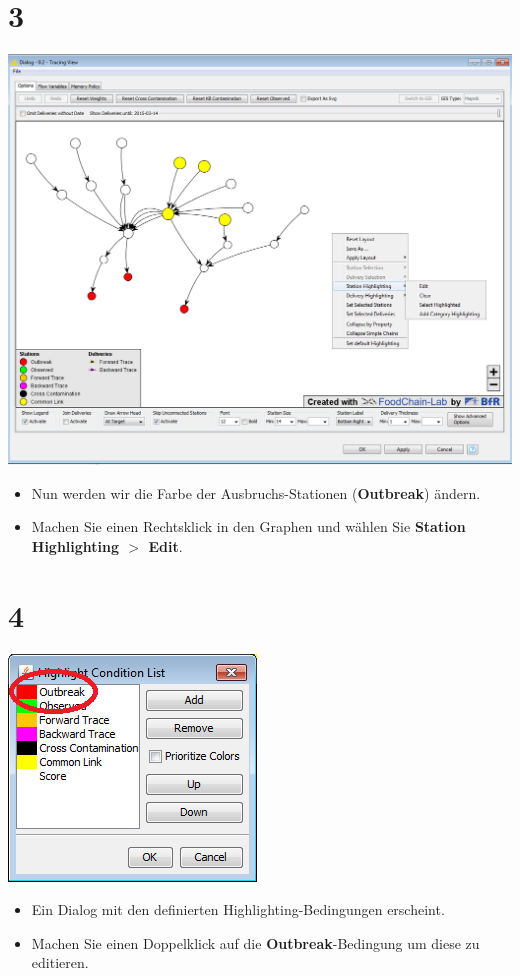 \documentclass{beamer}
\begin{document}
\section{3}
\begin{frame}
	\begin{center}
  		\includegraphics[height=0.6\textheight]{3.png}
	\end{center}
	\begin{itemize}
		\item Nun werden wir die Farbe der Ausbruchs-Stationen (\textbf{Outbreak}) ändern.
		\item Machen Sie einen Rechtsklick in den Graphen und wählen Sie \textbf{Station Highlighting $>$ Edit}.
	\end{itemize}
\end{frame}

\section{4}
\begin{frame}
	\begin{center}
  		\includegraphics[height=0.6\textheight]{4.png}
	\end{center}
	\begin{itemize}
		\item Ein Dialog mit den definierten Highlighting-Bedingungen erscheint.
		\item Machen Sie einen Doppelklick auf die \textbf{Outbreak}-Bedingung um diese zu editieren.
	\end{itemize}
\end{frame}
\end{document}
